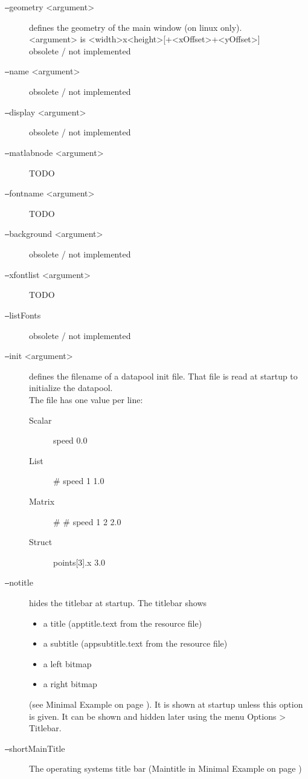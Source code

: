 \begin{description}
\item[\texttt{--}geometry <argument>] defines the geometry of the main window (on linux only). \\
  <argument> is <width>x<height>[+<xOffset>+<yOffset>] \\
  obsolete / not implemented
%
\item[\texttt{--}name <argument>]
  obsolete / not implemented
%
\item[\texttt{--}display <argument>]
  obsolete / not implemented
%
\item[\texttt{--}matlabnode <argument>]
  TODO
%
\item[\texttt{--}fontname <argument>]
  TODO
%
\item[\texttt{--}background <argument>]
  obsolete / not implemented
%
\item[\texttt{--}xfontlist <argument>]
  TODO
%
\item[\texttt{--}listFonts]
  obsolete / not implemented
%
\item[\texttt{--}init <argument>] defines the filename of a datapool init file.
  That file is read at startup to initialize the datapool. \\
  The file has one value per line:
  \begin{description}
  \item[Scalar] speed 0.0
  \item[List] \# speed 1 1.0
  \item[Matrix] \# \# speed 1 2 2.0
  \item[Struct] points[3].x 3.0
  \end{description}
%
\item[\texttt{--}notitle] hides the titlebar at startup.
  The titlebar shows
  \begin{itemize}
  \item a title (apptitle.text from the resource file)
  \item a subtitle (appsubtitle.text from the resource file)
  \item a left bitmap
  \item a right bitmap
  \end{itemize}
  (see Minimal Example on page \pageref{fig:minimalExample}).
  It is shown at startup unless this option is given.
  It can be shown and hidden later using the menu Options > Titlebar.
%
\item[\texttt{--}shortMainTitle]
  The operating systems title bar
  (Maintitle in Minimal Example on page \pageref{fig:minimalExample})

\end{description}
